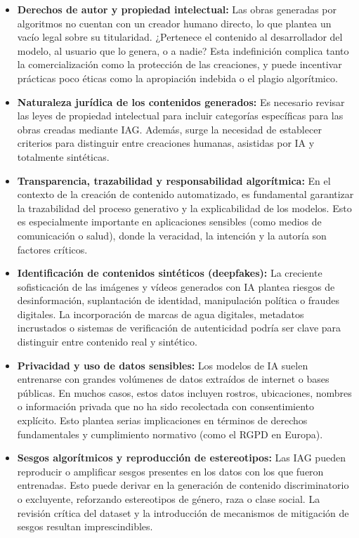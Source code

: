 \begin{itemize}
    \item \textbf{Derechos de autor y propiedad intelectual:} Las obras generadas por algoritmos no cuentan con un creador humano directo, lo que plantea un vacío legal sobre su titularidad. ¿Pertenece el contenido al desarrollador del modelo, al usuario que lo genera, o a nadie? Esta indefinición complica tanto la comercialización como la protección de las creaciones, y puede incentivar prácticas poco éticas como la apropiación indebida o el plagio algorítmico.
    
    \item \textbf{Naturaleza jurídica de los contenidos generados:} Es necesario revisar las leyes de propiedad intelectual para incluir categorías específicas para las obras creadas mediante IAG. Además, surge la necesidad de establecer criterios para distinguir entre creaciones humanas, asistidas por IA y totalmente sintéticas.
    
    \item \textbf{Transparencia, trazabilidad y responsabilidad algorítmica:} En el contexto de la creación de contenido automatizado, es fundamental garantizar la trazabilidad del proceso generativo y la explicabilidad de los modelos. Esto es especialmente importante en aplicaciones sensibles (como medios de comunicación o salud), donde la veracidad, la intención y la autoría son factores críticos.
    
    \item \textbf{Identificación de contenidos sintéticos (deepfakes):} La creciente sofisticación de las imágenes y vídeos generados con IA plantea riesgos de desinformación, suplantación de identidad, manipulación política o fraudes digitales. La incorporación de marcas de agua digitales, metadatos incrustados o sistemas de verificación de autenticidad podría ser clave para distinguir entre contenido real y sintético.
    
    \item \textbf{Privacidad y uso de datos sensibles:} Los modelos de IA suelen entrenarse con grandes volúmenes de datos extraídos de internet o bases públicas. En muchos casos, estos datos incluyen rostros, ubicaciones, nombres o información privada que no ha sido recolectada con consentimiento explícito. Esto plantea serias implicaciones en términos de derechos fundamentales y cumplimiento normativo (como el RGPD en Europa).
    
    \item \textbf{Sesgos algorítmicos y reproducción de estereotipos:} Las IAG pueden reproducir o amplificar sesgos presentes en los datos con los que fueron entrenadas. Esto puede derivar en la generación de contenido discriminatorio o excluyente, reforzando estereotipos de género, raza o clase social. La revisión crítica del dataset y la introducción de mecanismos de mitigación de sesgos resultan imprescindibles.
    

\end{itemize}
